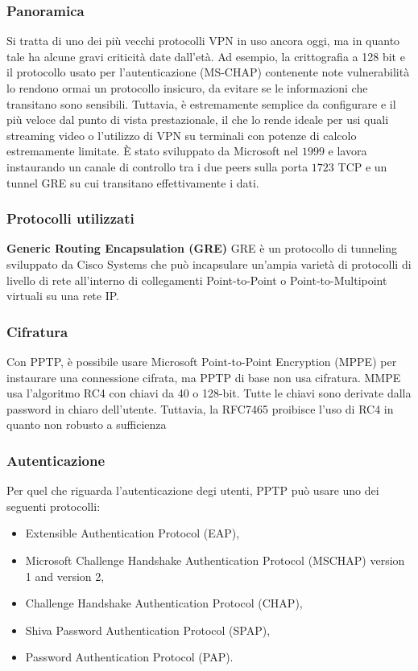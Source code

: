 \subsubsection{Panoramica}
Si tratta di uno dei più vecchi protocolli VPN in uso ancora oggi, ma in quanto tale ha alcune gravi criticità date dall'età. Ad esempio, la crittografia a 128 bit e il protocollo usato per l'autenticazione (MS-CHAP) contenente note vulnerabilità lo rendono ormai un protocollo insicuro, da evitare se le informazioni che transitano sono sensibili.
Tuttavia, è estremamente semplice da configurare e il più veloce dal punto di vista prestazionale, il che lo rende ideale per usi quali streaming video o l'utilizzo di VPN su terminali con potenze di calcolo estremamente limitate.
È stato sviluppato da Microsoft nel $1999$ \cite[RFC2637]{RFC2637} e lavora instaurando un canale di controllo tra i due peers sulla porta $1723$ TCP e un tunnel GRE  su cui transitano effettivamente i dati.

\subsubsection{Protocolli utilizzati}
\noindent \textbf{Generic Routing Encapsulation (GRE)}
GRE \cite[RFC2784]{RFC2784} è un protocollo di tunneling sviluppato da Cisco Systems che può incapsulare un'ampia varietà di protocolli di livello di rete all'interno di collegamenti Point-to-Point o Point-to-Multipoint virtuali su una rete IP.

\subsubsection{Cifratura}
Con PPTP, è possibile usare Microsoft Point-to-Point Encryption (MPPE) per instaurare una connessione cifrata, ma PPTP di base non usa cifratura. MMPE usa l'algoritmo RC4 con chiavi da 40 o 128-bit. Tutte le chiavi sono derivate dalla password in chiaro dell'utente. Tuttavia, la RFC7465 proibisce l'uso di RC4 in quanto non robusto a sufficienza

\subsubsection{Autenticazione}
Per quel che riguarda l'autenticazione degi utenti, PPTP può usare uno dei seguenti protocolli:
\begin{itemize}
    \item Extensible Authentication Protocol (EAP),
    \item Microsoft Challenge Handshake Authentication Protocol (MSCHAP) version 1 and version 2,
    \item Challenge Handshake Authentication Protocol (CHAP),
    \item Shiva Password Authentication Protocol (SPAP),
    \item Password Authentication Protocol (PAP).
\end{itemize}


